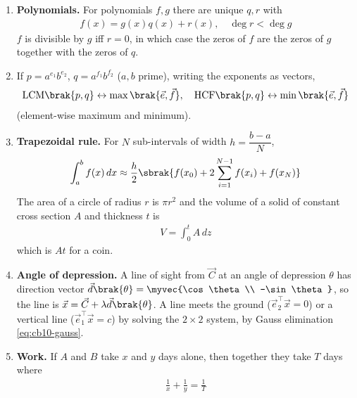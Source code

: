 \begin{enumerate}[label=\thesubsection.\arabic*, ref=\thesubsection.\theenumi,itemsep=0pt]
\item \textbf{Polynomials.} For polynomials $f, g$ there are unique $q, r$ with
\begin{align}
f(x) = g(x)q(x) + r(x), \quad \deg r < \deg g
\label{eq:cb10-polydiv}
\end{align}
$f$ is divisible by $g$ iff $r = 0$, in which case the zeros of $f$ are the zeros of $g$ together with the zeros of $q$.

\item If $p = a^{e_1}b^{e_2}$, $q = a^{f_1}b^{f_2}$ ($a, b$ prime), writing the exponents as vectors,
\begin{align}
\text{LCM}\brak{p,q} \leftrightarrow \max\brak{\vec{e},\vec{f}}, \quad \text{HCF}\brak{p,q} \leftrightarrow \min\brak{\vec{e},\vec{f}}
\label{eq:cb10-lcm}
\end{align}
(element-wise maximum and minimum).

\item \textbf{Trapezoidal rule.} For $N$ sub-intervals of width $h = \dfrac{b-a}{N}$,
\begin{align}
\int_a^b f(x)\,dx \approx \frac{h}{2}\sbrak{f(x_0) + 2\sum_{i=1}^{N-1}f(x_i) + f(x_N)}
\label{eq:cb10-trap}
\end{align}
The area of a circle of radius $r$ is $\pi r^2$ and the volume of a solid of constant cross section $A$ and thickness $t$ is
\begin{align}
V = \int_0^t A\,dz
\label{eq:cb10-vol}
\end{align}
which is $At$ for a coin.

\item \textbf{Angle of depression.} A line of sight from $\vec{C}$ at an angle of depression $\theta$ has direction vector $\vec{d}\brak{\theta} = \myvec{\cos\theta \\ -\sin\theta}$, so the line is $\vec{x} = \vec{C} + \lambda\vec{d}\brak{\theta}$. A line meets the ground ($\vec{e}_2^{\top}\vec{x} = 0$) or a vertical line ($\vec{e}_1^{\top}\vec{x} = c$) by solving the $2\times 2$ system, by Gauss elimination \eqref{eq:cb10-gauss}.
\label{eq:cb10-depr}

\item \textbf{Work.} If $A$ and $B$ take $x$ and $y$ days alone, then together they take $T$ days where
\begin{align}
\frac{1}{x} + \frac{1}{y} = \frac{1}{T}
\label{eq:cb10-work}
\end{align}

\end{enumerate}
